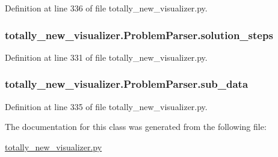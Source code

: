 Definition at line 336 of file totally\+\_\+new\+\_\+visualizer.\+py.

\hypertarget{classtotally__new__visualizer_1_1_problem_parser_a2922e97837374aee68052070231aa978}{}
\subsubsection[{solution\+\_\+steps}]{\setlength{\rightskip}{0pt plus 5cm}totally\+\_\+new\+\_\+visualizer.\+Problem\+Parser.\+solution\+\_\+steps}\label{classtotally__new__visualizer_1_1_problem_parser_a2922e97837374aee68052070231aa978}


Definition at line 331 of file totally\+\_\+new\+\_\+visualizer.\+py.

\hypertarget{classtotally__new__visualizer_1_1_problem_parser_a63fff6bd2c3015c278433317fc7c8e32}{}
\subsubsection[{sub\+\_\+data}]{\setlength{\rightskip}{0pt plus 5cm}totally\+\_\+new\+\_\+visualizer.\+Problem\+Parser.\+sub\+\_\+data}\label{classtotally__new__visualizer_1_1_problem_parser_a63fff6bd2c3015c278433317fc7c8e32}


Definition at line 335 of file totally\+\_\+new\+\_\+visualizer.\+py.



The documentation for this class was generated from the following file\+:\begin{DoxyCompactItemize}
\item 
\hyperlink{totally__new__visualizer_8py}{totally\+\_\+new\+\_\+visualizer.\+py}\end{DoxyCompactItemize}
